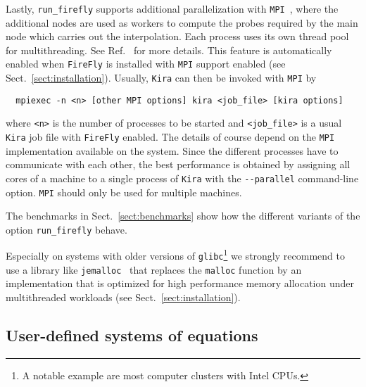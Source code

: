 \documentclass[11pt,a4paper,DIV=11,numbers=noenddot,parskip=half]{scrartcl}
\newcommand{\code}[1]{\texttt{#1}}
\newcommand*{\kira}{\code{Kira}}
\newcommand*{\firefly}{\code{FireFly}}
\newcommand*{\mpi}{\code{MPI}}
\begin{document}
Lastly, \code{run\_firefly} supports additional parallelization with \code{MPI}~\cite{mpi_forum}, where the additional nodes are used as workers to compute the probes required by the main node which carries out the interpolation.
Each process uses its own thread pool for multithreading.
See Ref.~\cite{Klappert:2020aqs} for more details.
This feature is automatically enabled when \firefly{} is installed with \code{MPI} support enabled (see Sect.~\ref{sect:installation}).
Usually, \kira{} can then be invoked with \code{MPI} by
\begin{verbatim}
  mpiexec -n <n> [other MPI options] kira <job_file> [kira options]
\end{verbatim}
where \verb|<n>| is the number of processes to be started and \verb|<job_file>| is a usual \kira{} job file with \firefly{} enabled.
The details of course depend on the \code{MPI} implementation available on the system.
Since the different processes have to communicate with each other, the best performance is obtained by assigning all cores of a machine to a single process of \kira{} with the \code{-{}-parallel} command-line option.
\mpi{} should only be used for multiple machines.

The benchmarks in Sect.~\ref{sect:benchmarks} show how the different variants of the option \code{run\_firefly} behave.

Especially on systems with older versions of \code{glibc}\footnote{A notable example are most computer clusters with Intel CPUs.} we strongly recommend to use a library like \code{jemalloc}~\cite{jemalloc} that replaces the \code{malloc} function by an implementation that is optimized for high performance memory allocation under multithreaded workloads (see Sect.~\ref{sect:installation}).


\subsection{User-defined systems of equations}
\label{subsect:user-defined-system}
\end{document}
